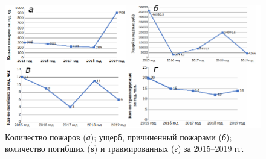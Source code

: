 \begin{figure}[h!]
\begin{changemargin}{-1cm}{0cm}
  \begin{center}
    \includegraphics[width=1.2\textwidth]{authors/zelencov_fig1.png}
  \end{center}
  \end{changemargin}
  \caption{Количество пожаров (\textit{а}); ущерб, причиненный пожарами (\textit{б}); количество погибших (\textit{в}) и травмированных (\textit{г}) за 2015--2019 гг.}
  \label{fig:/zelencov_fig1}
\end{figure}
